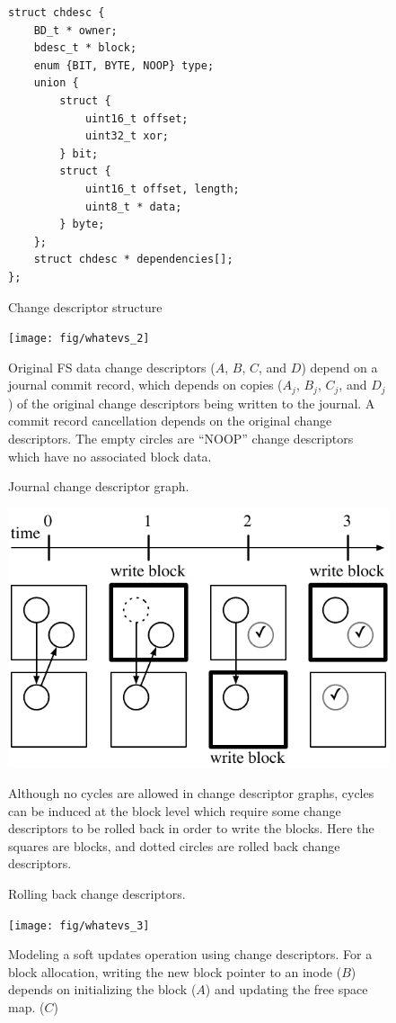 \begin{figure}
\begin{verbatim}
struct chdesc {
    BD_t * owner;
    bdesc_t * block;
    enum {BIT, BYTE, NOOP} type;
    union {
        struct {
            uint16_t offset;
            uint32_t xor;
        } bit;
        struct {
            uint16_t offset, length;
            uint8_t * data;
        } byte;
    };
    struct chdesc * dependencies[];
};
\end{verbatim}
\caption{\label{fig:chdesc} Change descriptor structure}
\end{figure}

\begin{figure}
  \centering
  \texttt{[image: fig/whatevs\_2]}
  \caption{\label{fig:journal} Journal change descriptor graph.}{Original FS
  data change descriptors ($A$, $B$, $C$, and $D$) depend on a journal commit
  record, which depends on copies ($A_j$, $B_j$, $C_j$, and $D_j$) of the
  original change descriptors being written to the journal. A commit record
  cancellation depends on the original change descriptors. The empty circles are
  ``NOOP'' change descriptors which have no associated block data.}
\end{figure}

\begin{figure}
  \centering
  \includegraphics[width=\columnwidth]{rollback_sequence}
  \caption{\label{fig:rollback} Rolling back change descriptors.}{Although no
  cycles are allowed in change descriptor graphs, cycles can be induced at the
  block level which require some change descriptors to be rolled back in order
  to write the blocks. Here the squares are blocks, and dotted circles are
  rolled back change descriptors.}
\end{figure}

\begin{figure}
  \centering
  \texttt{[image: fig/whatevs\_3]}
  \caption{\label{fig:softupdates} Modeling a soft updates operation using
  change descriptors. For a block allocation, writing the new block pointer to
  an inode ($B$) depends on initializing the block ($A$) and updating the free
  space map. ($C$)}
\end{figure}

